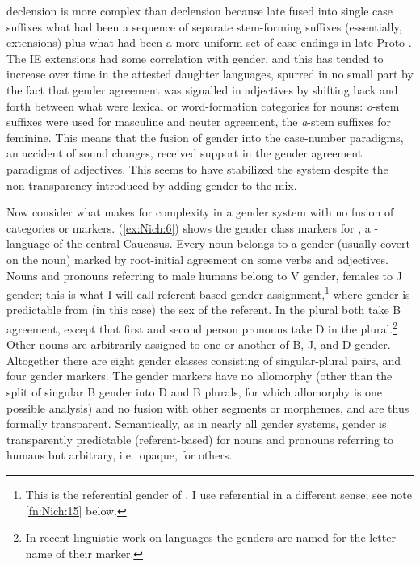\documentclass[output=collectionpaper]{langsci/langscibook}
\begin{document}
 declension is more complex than  declension because late  fused into single case suffixes what had been a sequence of separate stem-forming suffixes (essentially, extensions) plus what had been a more uniform set of case endings in late Proto-. The IE extensions had some correlation with gender, and this has tended to increase over time in the attested daughter languages, spurred in no small part by the fact that gender agreement was signalled in adjectives by shifting back and forth between what were lexical or word-formation categories for nouns: \textit{o}-stem suffixes were used for masculine and neuter agreement, the \textit{a}-stem suffixes for feminine. This means that the fusion of gender into the case-number paradigms, an accident of  sound changes, received support in the gender agreement paradigms of adjectives. This seems to have stabilized the system despite the non-transparency introduced by adding gender to the mix.

Now consider what makes for complexity in a gender system with no fusion of categories or markers. (\ref{ex:Nich:6}) shows the gender class markers for , a - language of the central Caucasus. Every noun belongs to a gender (usually covert on the noun) marked by root-initial agreement on some verbs and adjectives. Nouns and pronouns referring to male humans belong to V gender, females to J gender; this is what I will call referent-based gender assignment,\footnote{%
This is the referential gender of \citet{Dahl2000a}.  I use referential in a different sense; see note \ref{fn:Nich:15} below.
} %
where gender is predictable from (in this case) the sex of the referent.  In the plural both take B agreement, except that first and second person pronouns take D in the plural.\footnote{%
In recent linguistic work on  languages the genders are named for the letter name of their marker.
} %
Other nouns are arbitrarily assigned to one or another of B, J, and D gender. Altogether there are eight gender classes consisting of singular-plural pairs, and four gender markers. The gender markers have no allomorphy (other than the split of singular B gender into D and B plurals, for which allomorphy is one possible analysis) and no fusion with other segments or morphemes, and are thus formally transparent. Semantically, as in nearly all gender systems, gender is transparently predictable (referent-based) for nouns and pronouns referring to humans but arbitrary, i.e.\ opaque, for others.
\end{document}
